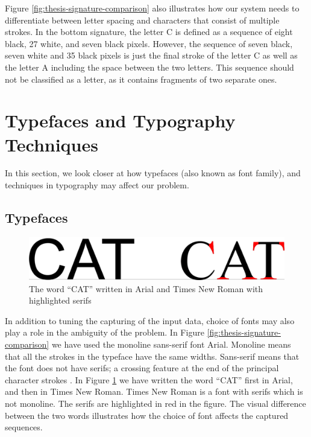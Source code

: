Figure \ref{fig:thesis-signature-comparison} also illustrates how our system needs to differentiate between letter spacing and characters that consist of multiple strokes. In the bottom signature, the letter C is defined as a sequence of eight black, 27 white, and seven black pixels. However, the sequence of seven black, seven white and 35 black pixels is just the final stroke of the letter C as well as the letter A including the space between the two letters. This sequence should not be classified as a letter, as it contains fragments of two separate ones.


\section{Typefaces and Typography Techniques}
\label{sec:use_of_fonts}
In this section, we look closer at how typefaces (also known as font family), and techniques in typography may affect our problem.

\subsection{Typefaces}
\begin{figure}[h]
    \centering
    \includegraphics[width=1.0\textwidth]{fig/chapter2/typeface_comparison.png}
    \caption{The word ``CAT'' written in Arial and Times New Roman with highlighted serifs}
    \label{fig:typeface-comparison}
\end{figure}

In addition to tuning the capturing of the input data, choice of fonts may also play a role in the ambiguity of the problem. In Figure \ref{fig:thesis-signature-comparison} we have used the monoline sans-serif font Arial. Monoline means that all the strokes in the typeface have the same widths. Sans-serif means that the font does not have serifs; a crossing feature at the end of the principal character strokes \citep{felici2011complete}. In Figure \ref{fig:typeface-comparison} we have written the word ``CAT'' first in Arial, and then in Times New Roman. Times New Roman is a font with serifs which is not monoline. The serifs are highlighted in red in the figure. The visual difference between the two words illustrates how the choice of font affects the captured sequences.

